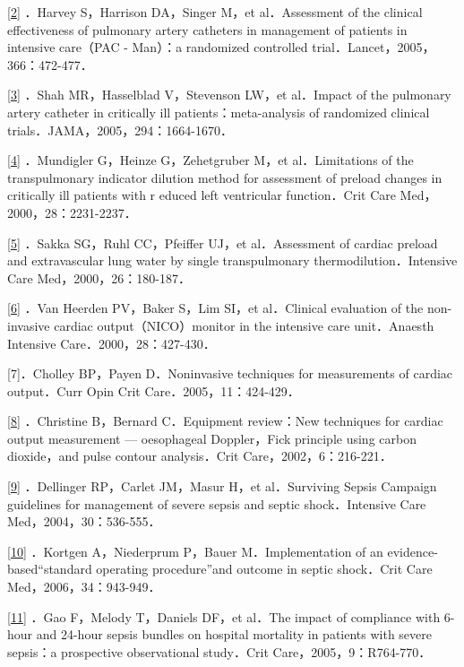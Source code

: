 \protect\hyperlink{text00008.htmlux5cux23ch2-7-back}{{[}2{]}} ．Harvey
S，Harrison DA，Singer M，et al．Assessment of the clinical
effectiveness of pulmonary artery catheters in management of patients in
intensive care（PAC - Man）：a randomized controlled
trial．Lancet，2005，366：472-477．

\protect\hyperlink{text00008.htmlux5cux23ch3-7-back}{{[}3{]}} ．Shah
MR，Hasselblad V，Stevenson LW，et al．Impact of the pulmonary artery
catheter in critically ill patients：meta-analysis of randomized
clinical trials．JAMA，2005，294：1664-1670．

\protect\hyperlink{text00008.htmlux5cux23ch4-7-back}{{[}4{]}}
．Mundigler G，Heinze G，Zehetgruber M，et al．Limitations of the
transpulmonary indicator dilution method for assessment of preload
changes in critically ill patients with r educed left ventricular
function．Crit Care Med，2000，28：2231-2237．

\protect\hyperlink{text00008.htmlux5cux23ch5-7-back}{{[}5{]}} ．Sakka
SG，Ruhl CC，Pfeiffer UJ，et al．Assessment of cardiac preload and
extravascular lung water by single transpulmonary
thermodilution．Intensive Care Med，2000，26：180-187．

\protect\hyperlink{text00008.htmlux5cux23ch6-7-back}{{[}6{]}} ．Van
Heerden PV，Baker S，Lim SI，et al．Clinical evaluation of the
non-invasive cardiac output（NICO）monitor in the intensive care
unit．Anaesth Intensive Care．2000，28：427-430．

{[}7{]}．Cholley BP，Payen D．Noninvasive techniques for measurements of
cardiac output．Curr Opin Crit Care．2005，11：424-429．

\protect\hyperlink{text00008.htmlux5cux23ch8-7-back}{{[}8{]}}
．Christine B，Bernard C．Equipment review：New techniques for cardiac
output measurement --- oesophageal Doppler，Fick principle using carbon
dioxide，and pulse contour analysis．Crit Care，2002，6：216-221．

\protect\hyperlink{text00008.htmlux5cux23ch9-7-back}{{[}9{]}}
．Dellinger RP，Carlet JM，Masur H，et al．Surviving Sepsis Campaign
guidelines for management of severe sepsis and septic shock．Intensive
Care Med，2004，30：536-555．

\protect\hyperlink{text00008.htmlux5cux23ch10-7-back}{{[}10{]}}
．Kortgen A，Niederprum P，Bauer M．Implementation of an
evidence-based“standard operating procedure”and outcome in septic
shock．Crit Care Med，2006，34：943-949．

\protect\hyperlink{text00008.htmlux5cux23ch11-7-back}{{[}11{]}} ．Gao
F，Melody T，Daniels DF，et al．The impact of compliance with 6-hour and
24-hour sepsis bundles on hospital mortality in patients with severe
sepsis：a prospective observational study．Crit
Care，2005，9：R764-770．

